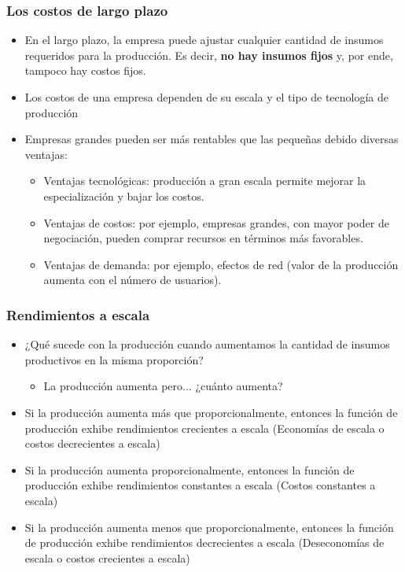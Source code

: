 \documentclass{beamer}
\begin{document}
\begin{frame}
\frametitle{Los costos de largo plazo}
\begin{itemize}
  \item En el largo plazo, la empresa puede ajustar cualquier cantidad de insumos requeridos para la producción. Es decir, \textbf{no hay insumos fijos} y, por ende, tampoco hay costos fijos. 
    \item Los costos de una empresa dependen de su escala y el tipo de tecnología de producción
    \item Empresas grandes pueden ser más rentables que las pequeñas debido diversas ventajas:
    \begin{itemize}
        \item Ventajas tecnológicas: producción a gran escala permite mejorar la especialización y bajar los costos. \vspace{1mm}
        \item Ventajas de costos: por ejemplo, empresas grandes, con mayor poder de negociación, pueden comprar recursos en términos más favorables.  \vspace{1mm}
        \item Ventajas de demanda: por ejemplo, efectos de red (valor de la producción aumenta con el número de usuarios).  \vspace{1mm}
    \end{itemize}
\end{itemize}
\end{frame}

\begin{frame}
\frametitle{Rendimientos a escala}
\begin{itemize}
    \item ¿Qué sucede con la producción cuando aumentamos la cantidad de insumos productivos en la misma proporción?
    \begin{itemize}
        \item La producción aumenta pero... ¿cuánto aumenta?
    \end{itemize}
    \item Si la producción aumenta más que proporcionalmente, entonces la función de producción exhibe rendimientos crecientes a escala (Economías de escala o costos decrecientes a escala)
    \item Si la producción aumenta proporcionalmente, entonces la función de producción exhibe rendimientos constantes a escala (Costos constantes a escala)
    \item Si la producción aumenta menos que proporcionalmente, entonces la función de producción exhibe rendimientos decrecientes a escala (Deseconomías de escala o costos crecientes a escala)
\end{itemize}
\end{frame}
\end{document}
